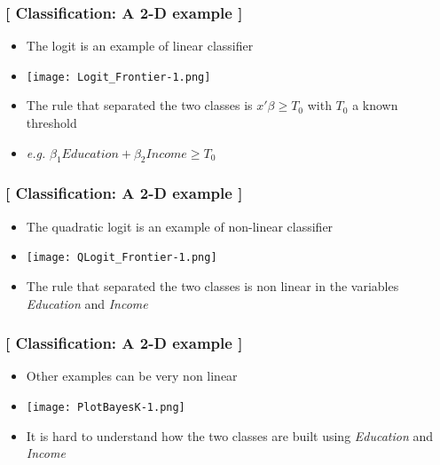 \documentclass[xcolor=x11names,compress, handhouts]{beamer}
\renewcommand{\(}{\begin{columns}}
\renewcommand{\)}{\end{columns}}
\newcommand{\<}[1]{\begin{column}{#1}}
\renewcommand{\>}{\end{column}}
\begin{document}
\begin{frame} %
\frametitle{\textcolor{brique}{[ Classification:  A 2-D example ]}}
\pause
\begin{itemize}[<+->]
  \item The logit is an example of linear classifier
  \item[] \begin{center}\texttt{[image: Logit\_Frontier-1.png]} \end{center}
  \item The rule that separated the two classes is $ x'\beta \geq T_0$ with $T_0$ a known threshold
  \item[]\textit{e.g.} $\beta_1 Education + \beta_2 Income \geq T_0$

\end{itemize}
\end{frame}

\begin{frame} %
\frametitle{\textcolor{brique}{[ Classification:  A 2-D example ]}}
\pause
\begin{itemize}[<+->]
  \item The quadratic logit is an example of non-linear classifier
  \item[] \begin{center}\texttt{[image: QLogit\_Frontier-1.png]} \end{center}
  \item The rule that separated the two classes is non linear in the variables \textit{Education}  and \textit{Income}
\end{itemize}
\end{frame}

\begin{frame} %
\frametitle{\textcolor{brique}{[ Classification:  A 2-D example ]}}
\pause
\begin{itemize}[<+->]
  \item Other examples can be very non linear
  \item[] \begin{center}\texttt{[image: PlotBayesK-1.png]} \end{center}
  \item It is hard to understand how the two classes  are built using \textit{Education}  and \textit{Income}
\end{itemize}
\end{frame}
\end{document}
